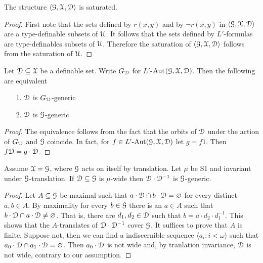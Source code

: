 \begin{fact}
  The structure $\langle\EuScript G,\EuScript X, \EuScript D\rangle$ is saturated.
\end{fact}

\begin{proof}
  First note that the sets defined by $r(x,y)$ and by $\neg r(x,y)$ in $\langle\EuScript G,\EuScript X, \EuScript D\rangle$ are a type-definable subsets of $\EuScript U$.
  It follows that the sets defined by $L'$-formulas are type-definables subsets of $\EuScript U$.
  Therefore the saturation of $\langle\EuScript G,\EuScript X, \EuScript D\rangle$ follows from the saturation of $\EuScript U$.
\end{proof}


\begin{fact}\label{fact_generic_G_L}
Let $\EuScript D\subseteq\EuScript X$ be a definable set.
Write $G_{\EuScript D}$ for $L'$-${\rm Aut\kern.15ex}(\EuScript G,\EuScript X,{\EuScript D})$.
Then the following are equivalent
\begin{itemize}
  \item[1.] $\EuScript D$ is $G_{\EuScript D}$-generic
  \item[2.] $\EuScript D$ is $\EuScript G$-generic.
\end{itemize}
\end{fact}

\begin{proof}
  The equivalence follows from the fact that the orbits of $\EuScript D$ under the action of $G_{\EuScript D}$ and $\EuScript G$ coincide.
  In fact, for $f\in L'\mbox{-Aut}(\EuScript G,\EuScript X,\EuScript D)$ let $g=f1$.
  Then $f{\EuScript D}=g\cdot\EuScript D$.
\end{proof}

\begin{fact}
  Assume $\EuScript X=\EuScript G$, where $\EuScript G$ acts on itself by translation. 
  Let $\mu$ be S1 and invariant under $\EuScript G$-translation.
  If $\EuScript D\subseteq\EuScript G$ is $\mu$-wide then $\EuScript D\cdot\EuScript D^{-1}$ is $\EuScript G$-generic.
\end{fact}

\begin{proof}
  Let $A\subseteq\EuScript G$ be maximal such that $a\cdot\EuScript D\cap b\cdot\EuScript D=\varnothing$ for every distinct $a,b \in A$.
  By maximality for every $b\in\EuScript G$ there is an $a\in A$ such that $b\cdot\EuScript D\cap a\cdot\EuScript D\neq\varnothing$.
  That is, there are $d_1,d_2\in\EuScript D$ such that $b=a\cdot d_2\cdot d_1^{-1}$.
  This shows that the $A$-translates of $\EuScript D\cdot\EuScript D^{-1}$ cover $\EuScript G$.
  It suffices to prove that $A$ is finite.
  Suppose not, then we can find a indiscernible sequence $\langle a_i:i<\omega\rangle$ such that $a_0\cdot\EuScript D\cap a_1\cdot\EuScript D=\varnothing$.
  Then $a_0\cdot\EuScript D$ is not wide and, by tranlation invariance, $\EuScript D$ is not wide, contrary to our assumption.
\end{proof}

